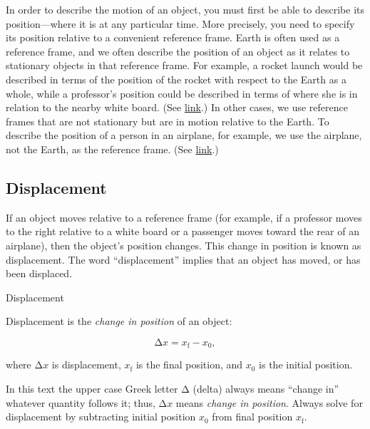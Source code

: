 \documentclass[
]{book}
\newenvironment{note}{}{}
\begin{document}
In order to describe the motion of an object, you must first be able to
describe its {position}---where it is at any
particular time. More precisely, you need to specify its position
relative to a convenient reference frame. Earth is often used as a
reference frame, and we often describe the position of an object as it
relates to stationary objects in that reference frame. For example, a
rocket launch would be described in terms of the position of the rocket
with respect to the Earth as a whole, while a professor's position
could be described in terms of where she is in relation to the nearby
white board. (See
\protect\hyperlink{import-auto-id2972079}{link}.) In other cases,
we use reference frames that are not stationary but are in motion
relative to the Earth. To describe the position of a person in an
airplane, for example, we use the airplane, not the Earth, as the
reference frame. (See
\protect\hyperlink{import-auto-id2707699}{link}.)

\hypertarget{fs-id2572460}{}
\hypertarget{displacement-1}{%
\subsection{Displacement}\label{displacement-1}}

If an object moves relative to a reference frame (for example, if a
professor moves to the right relative to a white board or a passenger
moves toward the rear of an airplane), then the object's position
changes. This change in position is known as
{displacement}. The word ``displacement'' implies that
an object has moved, or has been displaced.

\hypertarget{fs-id3206000}{}
\begin{note}

Displacement

Displacement is the \emph{change in position} of an object:

\leavevmode\hypertarget{eip-458}{}%
\[{\text{Δ}x = {x_{\text{f}} - x_{0}},}{}\]

where \({\text{Δ}x}{}\) is displacement, \(x_{\text{f}}{}\) is the final
position, and \emph{}\(x_{0}{}\) is the initial
position.

\end{note}

In this text the upper case Greek letter \(\text{Δ}{}\) (delta) always
means ``change in'' whatever quantity follows it; thus, \({\text{Δ}x}{}\)
means \emph{change in position}. Always solve for displacement by subtracting
initial position \(x_{0}{}\) from final position \(x_{\text{f}}{}\).
\end{document}
